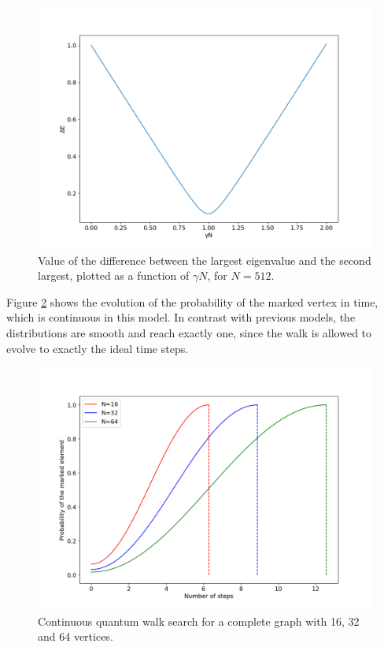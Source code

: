 \documentclass[../../dissertation.tex]{subfiles}
\begin{document}
\begin{figure}[h]
	\centering \includegraphics[scale=0.40]{img/ContQuantumWalk/Search/gamma512.png}
	\caption{Value of the difference between the largest eigenvalue and the second largest, plotted as a function of $\gamma N$, for $N=512$. }\label{fig:ContSearch}
	\label{fig:gamma512}
\end{figure}

Figure \ref{fig:ContSearch} shows the evolution of the probability of the marked vertex in time, which is continuous in this model. In contrast with previous models, the distributions are smooth and reach exactly one, since the walk is allowed to evolve to exactly the ideal time steps.

\begin{figure}[!t]
	\centering \includegraphics[scale=0.40]{img/ContQuantumWalk/Search/163264.png}
	\caption{Continuous quantum walk search for a complete graph with 16, 32 and 64 vertices.}\label{fig:ContSearch}
\end{figure}

\end{document}
